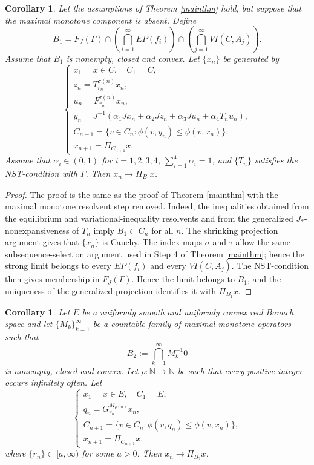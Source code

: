 \documentclass[leqno,12pt]{amsart}
\newtheorem{corollary}[theorem]{Corollary}
\theoremstyle{definition}
\numberwithin{equation}{section}
\begin{document}
\begin{corollary}\label{withoutMM}
Let the assumptions of Theorem \ref{mainthm} hold, but suppose that the maximal monotone component is absent. Define
\[
B_1=F_J(\Gamma)\cap\left(\bigcap_{i=1}^{\infty}EP(f_i)\right)
\cap\left(\bigcap_{j=1}^{\infty}VI(C,A_j)\right).
\]
Assume that $B_1$ is nonempty, closed and convex.
Let $\{x_n\}$ be generated by
\[
\left\{
\begin{array}{ll}
x_1=x\in C,\quad C_1=C,\\
z_n=T_{r_n}^{\sigma(n)}x_n,\\
u_n=F_{r_n}^{\tau(n)}x_n,\\
y_n=J^{-1}(\alpha_1Jx_n+\alpha_2Jz_n+\alpha_3Ju_n+\alpha_4T_nu_n),\\
C_{n+1}=\{v\in C_n:\phi(v,y_n)\leq\phi(v,x_n)\},\\
x_{n+1}=\Pi_{C_{n+1}}x.
\end{array}
\right.
\]
Assume that $\alpha_i\in(0,1)$ for $i=1,2,3,4$, $\sum_{i=1}^{4}\alpha_i=1$, and $\{T_n\}$ satisfies the NST-condition with $\Gamma$. Then $x_n\to \Pi_{B_1}x$.
\end{corollary}

\begin{proof}
The proof is the same as the proof of Theorem \ref{mainthm} with the maximal monotone resolvent step removed. Indeed, the inequalities obtained from the equilibrium and variational-inequality resolvents and from the generalized $J_{*}$-nonexpansiveness of $T_n$ imply $B_1\subset C_n$ for all $n$. The shrinking projection argument gives that $\{x_n\}$ is Cauchy. The index maps $\sigma$ and $\tau$ allow the same subsequence-selection argument used in Step 4 of Theorem \ref{mainthm}; hence the strong limit belongs to every $EP(f_i)$ and every $VI(C,A_j)$. The NST-condition then gives membership in $F_J(\Gamma)$. Hence the limit belongs to $B_1$, and the uniqueness of the generalized projection identifies it with $\Pi_{B_1}x$.
\end{proof}

\begin{corollary}\label{maxonly}
Let $E$ be a uniformly smooth and uniformly convex real Banach space and let $\{M_k\}_{k=1}^{\infty}$ be a countable family of maximal monotone operators such that
\[
B_2:=\bigcap_{k=1}^{\infty}M_k^{-1}0
\]
is nonempty, closed and convex. Let $\rho:\mathbb{N}\to\mathbb{N}$ be such that every positive integer occurs infinitely often. Let
\[
\left\{
\begin{array}{ll}
x_1=x\in E,\quad C_1=E,\\
q_n=G_{r_n}^{M_{\rho(n)}}x_n,\\
C_{n+1}=\{v\in C_n:\phi(v,q_n)\leq\phi(v,x_n)\},\\
x_{n+1}=\Pi_{C_{n+1}}x,
\end{array}
\right.
\]
where $\{r_n\}\subset[a,\infty)$ for some $a>0$. Then $x_n\to \Pi_{B_2}x$.
\end{corollary}
\end{document}
